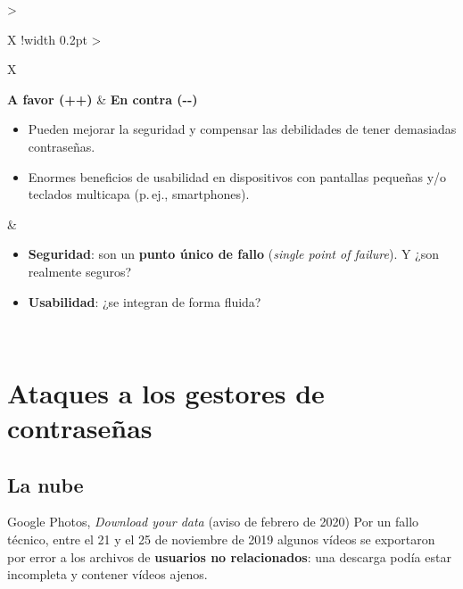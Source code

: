 \documentclass[11pt,a4paper]{report}
\begin{document}
\begin{center}
\small
{\setlength{\aboverulesep}{0pt}\setlength{\belowrulesep}{0pt}\renewcommand{\arraystretch}{1.3}%
\begin{tabularx}{\linewidth}{>{\raggedright\arraybackslash}X !{\color{gray!45}\vrule width 0.2pt} >{\raggedright\arraybackslash}X}
\toprule
\centering\textbf{A favor (++)} & \centering\arraybackslash\textbf{En contra (-{}-)} \\
\midrule
\vspace{-0.5\baselineskip}\begin{itemize}[leftmargin=*,nosep,topsep=0pt]
  \item Pueden mejorar la seguridad y compensar las debilidades de tener demasiadas contraseñas.
  \item Enormes beneficios de usabilidad en dispositivos con pantallas pequeñas y/o teclados multicapa (p.\,ej., smartphones).
\end{itemize}\vspace{2pt}
&
\vspace{-0.5\baselineskip}\begin{itemize}[leftmargin=*,nosep,topsep=0pt]
  \item \textbf{Seguridad}: son un \textbf{punto único de fallo} (\emph{single point of failure}). Y ¿son realmente seguros?
  \item \textbf{Usabilidad}: ¿se integran de forma fluida?
\end{itemize}\vspace{2pt} \\
\bottomrule
\end{tabularx}}
\end{center}
 
\section{Ataques a los gestores de contraseñas}
 
\subsection{La nube}
 
\begin{ejemplo}{Google Photos, \emph{Download your data} (aviso de febrero de 2020)}
Por un fallo técnico, entre el 21 y el 25 de noviembre de 2019 algunos vídeos se exportaron por error a los archivos de \textbf{usuarios no relacionados}: una descarga podía estar incompleta y contener vídeos ajenos.
\end{ejemplo}
 
\end{document}
